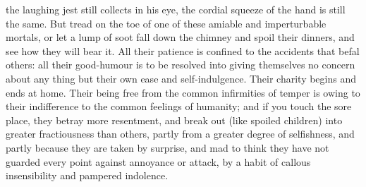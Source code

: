 the laughing jest still collects in his eye, the cordial squeeze
of the hand is still the same. But tread on the toe of one of
these amiable and imperturbable mortals, or let a lump of soot
fall down the chimney and spoil their dinners, and see how they
will bear it. All their patience is confined to the accidents that
befal others: all their good-humour is to be resolved into giving
themselves no concern about any thing but their own ease and
self-indulgence. Their charity begins and ends at home. Their
being free from the common infirmities of temper is owing to their
indifference to the common feelings of humanity; and if you touch
the sore place, they betray more resentment, and break out (like
spoiled children) into greater fractiousness than others, partly
from a greater degree of selfishness, and partly because they are
taken by surprise, and mad to think they have not guarded every
point against annoyance or attack, by a habit of callous
insensibility and pampered indolence.

